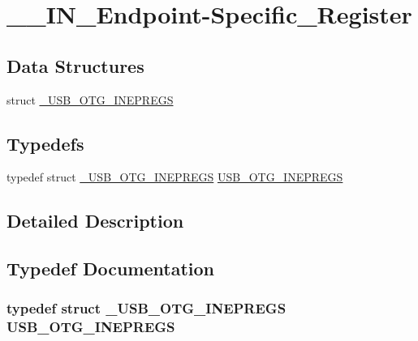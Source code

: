 \hypertarget{group_______i_n___endpoint-_specific___register}{\section{\-\_\-\-\_\-\-I\-N\-\_\-\-Endpoint-\/\-Specific\-\_\-\-Register}
\label{group_______i_n___endpoint-_specific___register}
}
\subsection*{Data Structures}
\begin{DoxyCompactItemize}
\item 
struct \hyperlink{struct___u_s_b___o_t_g___i_n_e_p_r_e_g_s}{\-\_\-\-U\-S\-B\-\_\-\-O\-T\-G\-\_\-\-I\-N\-E\-P\-R\-E\-G\-S}
\end{DoxyCompactItemize}
\subsection*{Typedefs}
\begin{DoxyCompactItemize}
\item 
typedef struct \hyperlink{struct___u_s_b___o_t_g___i_n_e_p_r_e_g_s}{\-\_\-\-U\-S\-B\-\_\-\-O\-T\-G\-\_\-\-I\-N\-E\-P\-R\-E\-G\-S} \hyperlink{group_______i_n___endpoint-_specific___register_ga31786dae3bf9816d3e69f67559bb1499}{U\-S\-B\-\_\-\-O\-T\-G\-\_\-\-I\-N\-E\-P\-R\-E\-G\-S}
\end{DoxyCompactItemize}


\subsection{Detailed Description}


\subsection{Typedef Documentation}
\hypertarget{group_______i_n___endpoint-_specific___register_ga31786dae3bf9816d3e69f67559bb1499}{
\subsubsection[{U\-S\-B\-\_\-\-O\-T\-G\-\_\-\-I\-N\-E\-P\-R\-E\-G\-S}]{\setlength{\rightskip}{0pt plus 5cm}typedef struct {\bf \-\_\-\-U\-S\-B\-\_\-\-O\-T\-G\-\_\-\-I\-N\-E\-P\-R\-E\-G\-S}
 {\bf U\-S\-B\-\_\-\-O\-T\-G\-\_\-\-I\-N\-E\-P\-R\-E\-G\-S}}}\label{group_______i_n___endpoint-_specific___register_ga31786dae3bf9816d3e69f67559bb1499}
